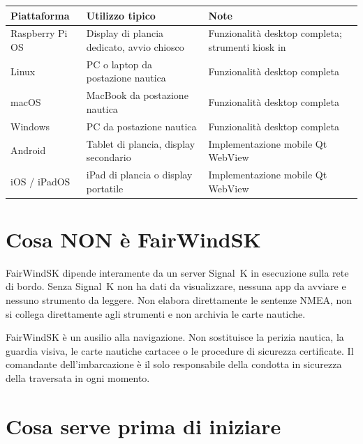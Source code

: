 \begin{longtable}{L{3.0cm}L{4.8cm}L{5.9cm}}
\toprule
{}
\color{white}\sffamily\bfseries Piattaforma &
\color{white}\sffamily\bfseries Utilizzo tipico &
\color{white}\sffamily\bfseries Note \\
\midrule
Raspberry Pi OS & Display di plancia dedicato, avvio chiosco &
  Funzionalità desktop completa; strumenti kiosk in  \\
Linux           & PC o laptop da postazione nautica    & Funzionalità desktop completa \\
macOS           & MacBook da postazione nautica         & Funzionalità desktop completa \\
Windows         & PC da postazione nautica              & Funzionalità desktop completa \\
Android         & Tablet di plancia, display secondario & Implementazione mobile Qt WebView \\
iOS / iPadOS    & iPad di plancia o display portatile   & Implementazione mobile Qt WebView \\
\bottomrule
\end{longtable}

\section{Cosa NON è FairWindSK}

FairWindSK dipende interamente da un server Signal~K in esecuzione sulla rete di bordo.
Senza Signal~K non ha dati da visualizzare, nessuna app da avviare e nessuno strumento
da leggere. Non elabora direttamente le sentenze NMEA, non si collega direttamente agli
strumenti e non archivia le carte nautiche.

\begin{warningbox}
FairWindSK è un ausilio alla navigazione.
Non sostituisce la perizia nautica, la guardia visiva, le carte nautiche cartacee
o le procedure di sicurezza certificate.
Il comandante dell'imbarcazione è il solo responsabile della condotta in sicurezza
della traversata in ogni momento.
\end{warningbox}

\section{Cosa serve prima di iniziare}

